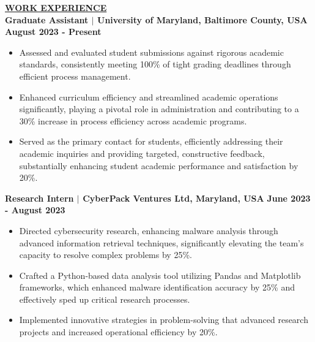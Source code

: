 \documentclass{article}
\begin{document}
\noindent \textbf{\underline{WORK EXPERIENCE}} \\
\noindent \textbf{Graduate Assistant $\mid$ University of Maryland, Baltimore County, USA}  \hfill \textbf{August 2023 - Present}
\begin{itemize}[noitemsep,nolistsep,leftmargin=*]
\item {\small Assessed and evaluated student submissions against rigorous academic standards, consistently meeting 100\% of tight grading deadlines through efficient process management.}
\item {\small Enhanced curriculum efficiency and streamlined academic operations significantly, playing a pivotal role in administration and contributing to a 30\% increase in process efficiency across academic programs.}
\item {\small Served as the primary contact for students, efficiently addressing their academic inquiries and providing targeted, constructive feedback, substantially enhancing student academic performance and satisfaction by 20\%.}\\
\end{itemize}


\noindent \textbf{Research Intern $\mid$ CyberPack Ventures Ltd, Maryland, USA} \hfill \textbf{June 2023 - August 2023}
\begin{itemize}[noitemsep,nolistsep,leftmargin=*]
\item {\small Directed cybersecurity research, enhancing malware analysis through advanced information retrieval techniques, significantly elevating the team's capacity to resolve complex problems by 25\%.}
\item {\small Crafted a Python-based data analysis tool utilizing Pandas and Matplotlib frameworks, which enhanced malware identification accuracy by 25\% and effectively sped up critical research processes.}
\item {\small Implemented innovative strategies in problem-solving that advanced research projects and increased operational efficiency by 20\%.}\\
\end{itemize}
\end{document}
